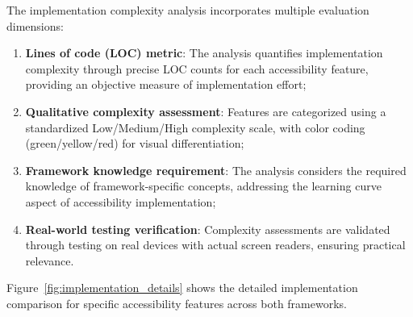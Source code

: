 The implementation complexity analysis incorporates multiple evaluation dimensions:

\begin{enumerate}
    \item \textbf{Lines of code (LOC) metric}: The analysis quantifies implementation complexity through precise LOC counts for each accessibility feature, providing an objective measure of implementation effort;
    
    \item \textbf{Qualitative complexity assessment}: Features are categorized using a standardized Low/Medium/High complexity scale, with color coding (green/yellow/red) for visual differentiation;
    
    \item \textbf{Framework knowledge requirement}: The analysis considers the required knowledge of framework-specific concepts, addressing the learning curve aspect of accessibility implementation;
    
    \item \textbf{Real-world testing verification}: Complexity assessments are validated through testing on real devices with actual screen readers, ensuring practical relevance.
\end{enumerate}

Figure~\ref{fig:implementation_details} shows the detailed implementation comparison for specific accessibility features across both frameworks.

